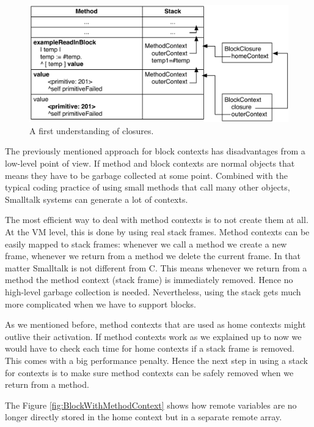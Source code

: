 \documentclass[a4paper,10pt,twoside]{book}
\begin{document}
\begin{figure}
  \begin{center}
    \includegraphics[width=\textwidth]{BlockWithFullClosures}
    \caption{A first understanding of closures.\label{fig:BlockWithFullClosures}}
  \end{center}
\end{figure}

The previously mentioned approach for block contexts has disadvantages from a low-level point of view.
If method and block contexts are normal objects that means they have to be garbage collected at some point.
Combined with the typical coding practice of using small methods that call many other objects, Smalltalk systems can generate a lot of contexts.

The most efficient way to deal with method contexts is to not create them at all.
At the VM level, this is done by using real stack frames.
Method contexts can be easily mapped to stack frames: whenever we call a method we create a new frame, whenever we return from a method we delete the current frame.
In that matter Smalltalk is not different from C.
This means whenever we return from a method the method context (stack frame) is immediately removed.
Hence no high-level garbage collection is needed.
Nevertheless, using the stack gets much more complicated when we have to support blocks.

As we mentioned before, method contexts that are used as home contexts might outlive their activation.
If method contexts work as we explained up to now we would have to check each time for home contexts if a stack frame is removed.
This comes with a big performance penalty.
Hence the next step in using a stack for contexts is to make sure method contexts can be safely removed when we return from a method.

The Figure \ref{fig:BlockWithMethodContext} shows how remote variables
are no longer directly stored in the home context but in a separate
remote array.
\end{document}
